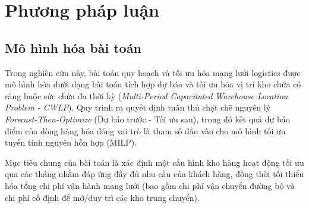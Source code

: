 \chapter{Phương pháp luận}

\section{Mô hình hóa bài toán}
\label{sec:problem_modeling}

Trong nghiên cứu này, bài toán quy hoạch và tối ưu hóa mạng lưới logistics được mô hình hóa dưới dạng bài toán tích hợp dự báo và tối ưu hóa vị trí kho chứa có ràng buộc sức chứa đa thời kỳ (\textit{Multi-Period Capacitated Warehouse Location Problem - CWLP}). Quy trình ra quyết định tuân thủ chặt chẽ nguyên lý \textit{Forecast-Then-Optimize} (Dự báo trước - Tối ưu sau), trong đó kết quả dự báo điểm của dòng hàng hóa đóng vai trò là tham số đầu vào cho mô hình tối ưu tuyến tính nguyên hỗn hợp (MILP).

Mục tiêu chung của bài toán là xác định một cấu hình kho hàng hoạt động tối ưu qua các tháng nhằm đáp ứng đầy đủ nhu cầu của khách hàng, đồng thời tối thiểu hóa tổng chi phí vận hành mạng lưới (bao gồm chi phí vận chuyển đường bộ và chi phí cố định để mở/duy trì các kho trung chuyển).

